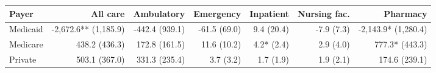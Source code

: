 \begin{tabular}{@{}l rrrrrr@{}}
\toprule
Payer & All care & Ambulatory & Emergency & Inpatient & Nursing fac. & Pharmacy \\
\midrule
Medicaid & -2,672.6** (1,185.9) & -442.4 (939.1) & -61.5 (69.0) & 9.4 (20.4) & -7.9 (7.3) & -2,143.9* (1,280.4) \\
Medicare & 438.2 (436.3) & 172.8 (161.5) & 11.6 (10.2) & 4.2* (2.4) & 2.9 (4.0) & 777.3* (443.3) \\
Private & 503.1 (367.0) & 331.3 (235.4) & 3.7 (3.2) & 1.7 (1.9) & 1.9 (2.1) & 174.6 (239.1) \\
\bottomrule
\end{tabular}

